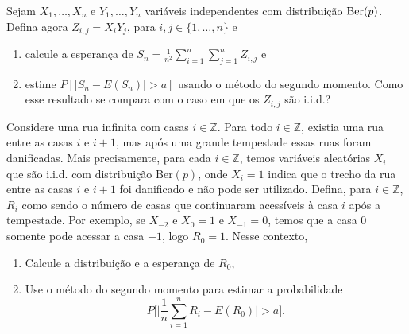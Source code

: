 \begin{exercise}
  Sejam $X_1, \dots, X_n$ e $Y_1, \dots, Y_n$ variáveis independentes com distribuição $\operatorname{Ber}(p)$.
  Defina agora $Z_{i,j} = X_i Y_j$, para $i, j \in \{1, \dots, n\}$ e
  \begin{enumerate}[\quad a)]
  \item calcule a esperança de $S_n = \tfrac{1}{n^2} \sum_{i=1}^n \sum_{j=1}^n Z_{i,j}$ e
  \item estime $P[|S_n - E(S_n)| > a]$ usando o método do segundo momento. Como esse resultado se compara com o caso em que os $Z_{i,j}$ são i.i.d.?
  \end{enumerate}
\end{exercise}

\begin{exercise}
  \label{x:casas_tempestade}
  Considere uma rua infinita com casas $i \in \mathbb{Z}$.
  Para todo $i \in \mathbb{Z}$, existia uma rua entre as casas $i$ e $i+1$, mas após uma grande tempestade essas ruas foram danificadas.
  Mais precisamente, para cada $i \in \mathbb{Z}$, temos variáveis aleatórias $X_i$ que são i.i.d. com distribuição $\text{Ber}(p)$, onde $X_i = 1$ indica que o trecho da rua entre as casas $i$ e $i + 1$ foi danificado e não pode ser utilizado.
  Defina, para $i \in \mathbb{Z}$, $R_i$ como sendo o número de casas que continuaram acessíveis à casa $i$ após a tempestade.
  Por exemplo, se $X_{-2}$ e $X_0 = 1$ e $X_{-1} = 0$, temos que a casa $0$ somente pode acessar a casa $-1$, logo $R_0 = 1$.
  Nesse contexto,
  \begin{enumerate}[\quad a)]
  \item Calcule a distribuição e a esperança de $R_0$,
  \item Use o método do segundo momento para estimar a probabilidade
    \begin{equation}
      P \Big[ \Big| \frac{1}{n} \sum_{i=1}^n R_i - E(R_0) \Big| > a \Big].
    \end{equation}
  \end{enumerate}
\end{exercise}

